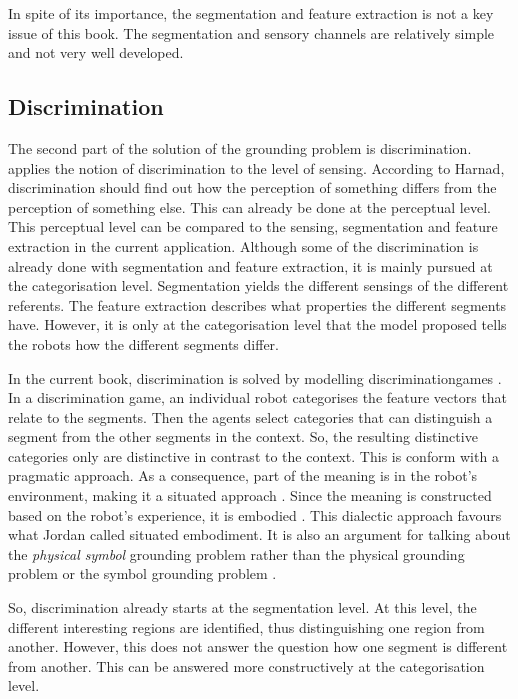 In spite of its importance, the segmentation and feature extraction is not a key issue of this book. The segmentation and sensory channels are relatively simple and not very well developed. 

\subsection{Discrimination}

The second part of the solution of the grounding problem is discrimination. \citet{harnad:1990} applies the notion of discrimination to the level of sensing. According to Harnad, discrimination should find out how the perception of something differs from the perception of something else. This can already be done at the perceptual level. This perceptual level can be compared to the sensing, segmentation and feature extraction in the current application. Although some of the discrimination is already done with segmentation and feature extraction, it is mainly pursued at the categorisation level. Segmentation yields the different sensings of the different referents. The feature extraction describes what properties the different segments have. However, it is only at the categorisation level that the model proposed tells the robots how the different segments differ.

In the current book, discrimination is solved by modelling discrimination\linebreak games \citep{steels:1996b}. In a discrimination game, an individual robot categorises the feature vectors that relate to the segments. Then the agents select categories that can distinguish a segment from the other segments in the context. So, the resulting distinctive categories only are distinctive in contrast to the context. This is conform with a pragmatic approach. As a consequence, part of the meaning is in the robot's environment, making it a situated approach \citep{clancey:1997}. Since the meaning is constructed based on the robot's experience, it is embodied \citep{lakoff:1987}. This dialectic approach favours what Jordan \citet{zlatev:1997} called situated embodiment. It is also an argument for talking about the {\em physical symbol} grounding problem rather than the physical grounding problem \citep{brooks:1990} or the symbol grounding problem \citep{harnad:1990}.

So, discrimination already starts at the segmentation level. At this level, the different interesting regions are identified, thus distinguishing one region from another. However, this does not answer the question how one segment is different from another. This can be answered more constructively at the categorisation level.

